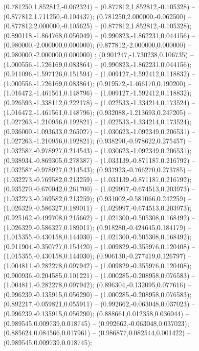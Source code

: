  (0.781250,1.852812,-0.062324) -- (0.877812,1.852812,-0.105328) -- (0.877812,1.711250,-0.104437);
 (0.781250,2.000000,-0.062500) -- (0.877812,2.000000,-0.105625) -- (0.877812,1.852812,-0.105328);
 (0.890118,-1.864768,0.056049) -- (0.990823,-1.862231,0.044156) -- (0.980000,-2.000000,0.000000);
 (0.877812,-2.000000,0.000000) -- (0.980000,-2.000000,0.000000) ;
 (0.901247,-1.730238,0.106735) -- (1.000556,-1.726169,0.083864) -- (0.990823,-1.862231,0.044156);
 (0.911096,-1.597126,0.151594) -- (1.009127,-1.592412,0.118832) -- (1.000556,-1.726169,0.083864);
 (0.919572,-1.466170,0.190200) -- (1.016472,-1.461561,0.148796) -- (1.009127,-1.592412,0.118832);
 (0.926593,-1.338112,0.222178) -- (1.022533,-1.334214,0.173524) -- (1.016472,-1.461561,0.148796);
 (0.932088,-1.213693,0.247205) -- (1.027263,-1.210956,0.192821) -- (1.022533,-1.334214,0.173524);
 (0.936000,-1.093633,0.265027) -- (1.030623,-1.092349,0.206531) -- (1.027263,-1.210956,0.192821);
 (0.938290,-0.978622,0.275457) -- (1.032587,-0.978927,0.214543) -- (1.030623,-1.092349,0.206531);
 (0.938934,-0.869305,0.278387) -- (1.033139,-0.871187,0.216792) -- (1.032587,-0.978927,0.214543);
 (0.937923,-0.766270,0.273785) -- (1.032273,-0.769582,0.213259) -- (1.033139,-0.871187,0.216792);
 (0.935270,-0.670042,0.261700) -- (1.029997,-0.674513,0.203973) -- (1.032273,-0.769582,0.213259);
 (0.931002,-0.581066,0.242259) -- (1.026329,-0.586327,0.189011) -- (1.029997,-0.674513,0.203973);
 (0.925162,-0.499708,0.215662) -- (1.021300,-0.505308,0.168492) -- (1.026329,-0.586327,0.189011);
 (0.918280,-0.424645,0.184179) -- (1.015355,-0.430158,0.144030) -- (1.021300,-0.505308,0.168492);
 (0.911904,-0.350727,0.154420) -- (1.009829,-0.355976,0.120408) -- (1.015355,-0.430158,0.144030);
 (0.906130,-0.277419,0.126797) -- (1.004811,-0.282278,0.097942) -- (1.009829,-0.355976,0.120408);
 (0.900936,-0.204585,0.101221) -- (1.000285,-0.208958,0.076583) -- (1.004811,-0.282278,0.097942);
 (0.896304,-0.132095,0.077616) -- (0.996239,-0.135915,0.056290) -- (1.000285,-0.208958,0.076583);
 (0.892217,-0.059821,0.055911) -- (0.992662,-0.063048,0.037023) -- (0.996239,-0.135915,0.056290);
 (0.888661,0.012358,0.036044) -- (0.989545,0.009739,0.018745) -- (0.992662,-0.063048,0.037023);
 (0.885624,0.084566,0.017961) -- (0.986877,0.082544,0.001422) -- (0.989545,0.009739,0.018745);
